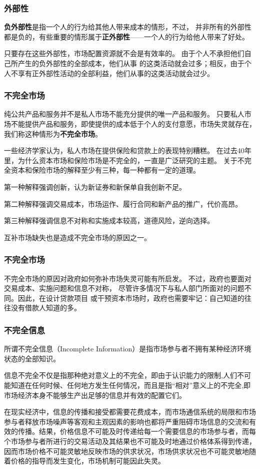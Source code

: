 \documentclass[aspectratio=169, 12pt]{beamer}
\begin{document}
\begin{frame}[plain]
    \frametitle{外部性}
    \textbf{负外部性}是指一个人的行为给其他人带来成本的情形，不过，
    并非所有的外部性都是负的，有些重要的情形属于\textbf{正外部性}——一个人的行为给他人带来了好处。
    \par
    只要存在这些外部性，市场配置资源就不会是有效率的。
    由于个人不承担他们自己所产生的负外部性的全部成本，他们从事
    的这类活动就会过多；相反，由于个人不享有正外部性活动的全部利益，他们从事的这类活动就会过少。
\end{frame}

\begin{frame}[plain]
    \frametitle{不完全市场}
    纯公共产品和服务并不是私人市场不能充分提供的唯一产品和服务。
    只要私人市场不能提供产品和服务，即使提供的成本低于个人的支付意愿，市场失灵就存在，
    我们称这种情形为\textbf{不完全市场}。\par
    一些经济学家认为，私人市场在提供保险和贷款上的表现特别糟糕。
    在过去40年里，为什么资本市场和保险市场是不完全的，一直是广泛研究的主题。
    关于不完全资本和保险市场的解释至少有三种，每一种都有一定的道理。
    \par
    第一种解释强调创新，认为新证券和新保单自我创新不足。
    \par
    第二种解释强调交易成本，市场运作、履行合同和新产品的推广，代价高昂。
    \par
    第三种解释强调信息不对称和实施成本较高，道德风险，逆向选择。
    \par
    互补市场缺失也是造成不完全市场的原因之一。
\end{frame}

\begin{frame}[plain]
    \frametitle{不完全市场}
    不完全市场的原因对政府如何弥补市场失灵可能有所启发。
    不过，政府也要面对交易成本、实施问题和信息不对称，
    尽管许多情况下与私人部门所面对的问题不同。因此，在设计贷款项目
    或干预资本市场时，政府也需要牢记：自己知道的往往没有借款人知道的多。
\end{frame}

\begin{frame}[plain]
    \frametitle{不完全信息}
    所谓不完全信息（Incomplete Information）是指市场参与者不拥有某种经济环境状态的全部知识。
    \par
    信息不完全不仅是指那种绝对意义上的不完全，即由于认识能力的限制,人们不可能知道在任何时候、任何地方发生任何情况，而且是指“相对”意义上的不完全,即市场经济本身不能够生产出足够的信息并有效的配置它们。
    \par
    在现实经济中，信息的传播和接受都需要花费成本，而市场通信系统的局限和市场参与者释放市场噪声等客观和主观因素的影响也都将严重阻碍市场信息的交流和有效的传播。结果，价格信息不可能及时传递给每一个需要信息的市场参与者，而每个市场参与者所进行的交易活动及其结果也不可能及时地通过价格体系得到传递，因而市场价格不可能灵敏地反映市场的供求状况，市场供求状况也不可能灵敏地随着价格的指导而发生变化，市场机制可能因此失灵。
\end{frame}
\end{document}
